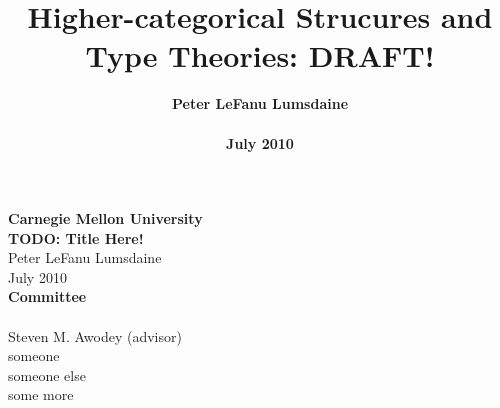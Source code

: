 \documentclass{amsbook}
\theoremstyle{plain}
\theoremstyle{definition}
\begin{document}
\frontmatter


\title[Higher-categorical Structures and Type Theories]{Higher-categorical Strucures and Type Theories: DRAFT!}

\author[P. LeF. Lumsdaine]{{\large\bf Peter LeFanu Lumsdaine}\\~\\\normalsize
  \bf July 2010}

\maketitle
\newpage
\thispagestyle{empty}
\begin{center}
  {\Large\textbf{Carnegie Mellon University}}\\
  \vspace{1cm}
  {\large\textbf{TODO: Title Here!}}\\
  \vspace{.5cm}
  Peter LeFanu Lumsdaine\\
  \vspace{.5cm}
  July 2010\\
  \vspace{3cm}
  \textbf{Committee}\\~\\
  Steven M. Awodey (advisor)\\
  someone \\
  someone else \\
  some more \\

\end{center}
 
\setcounter{page}{3}




\tableofcontents





%
%



\mainmatter




\end{document}
